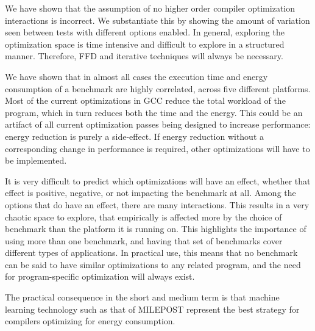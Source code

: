 \documentclass[twocolumn]{article}
\begin{document}
We have shown that the assumption of no higher order compiler optimization interactions is incorrect. We substantiate this by showing the amount of variation seen between tests with different options enabled. In general, exploring the optimization space is time intensive and difficult to explore in a structured manner. Therefore, FFD and iterative techniques will always be necessary.

We have shown that in almost all cases the execution time and energy consumption of a benchmark are highly correlated, across five different platforms. Most of the current optimizations in GCC reduce the total workload of the program, which in turn reduces both the time and the energy. This could be an artifact of all current optimization passes being designed to increase performance: energy reduction is purely a side-effect. If energy reduction without a corresponding change in performance is required, other optimizations will have to be implemented.

It is very difficult to predict which optimizations will have an effect, whether that effect is positive, negative, or not impacting the benchmark at all. Among the options that do have an effect, there are many interactions. This results in a very chaotic space to explore, that empirically is affected more by the choice of benchmark than the platform it is running on. This highlights the importance of using more than one benchmark, and having that set of benchmarks cover different types of applications. In practical use, this means that no benchmark can be said to have similar optimizations to any related program, and the need for program-specific optimization will always exist.

The practical consequence in the short and medium term is that machine learning technology such as that of MILEPOST represent the best strategy for compilers optimizing for energy consumption.

\printbibliography
\end{document}
